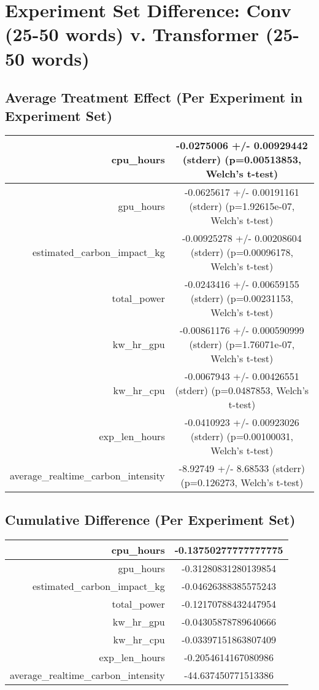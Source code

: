 \documentclass{article}%
\begin{document}
%
\normalsize%
\section{Experiment Set Difference: Conv (25{-}50 words) v. Transformer (25{-}50 words)}%
\label{sec:Experiment Set Difference Conv (25{-}50 words) v. Transformer (25{-}50 words)}%
\subsection{Average Treatment Effect (Per Experiment in Experiment Set)}%
\label{subsec:Average Treatment Effect (Per Experiment in Experiment Set)}%
\begin{tabular}{|r|c|}%
\hline%
cpu\_hours&{-}0.0275006 +/{-} 0.00929442 (stderr) (p=0.00513853, Welch's t{-}test)\\%
\hline%
gpu\_hours&{-}0.0625617 +/{-} 0.00191161 (stderr) (p=1.92615e{-}07, Welch's t{-}test)\\%
\hline%
estimated\_carbon\_impact\_kg&{-}0.00925278 +/{-} 0.00208604 (stderr) (p=0.00096178, Welch's t{-}test)\\%
\hline%
total\_power&{-}0.0243416 +/{-} 0.00659155 (stderr) (p=0.00231153, Welch's t{-}test)\\%
\hline%
kw\_hr\_gpu&{-}0.00861176 +/{-} 0.000590999 (stderr) (p=1.76071e{-}07, Welch's t{-}test)\\%
\hline%
kw\_hr\_cpu&{-}0.0067943 +/{-} 0.00426551 (stderr) (p=0.0487853, Welch's t{-}test)\\%
\hline%
exp\_len\_hours&{-}0.0410923 +/{-} 0.00923026 (stderr) (p=0.00100031, Welch's t{-}test)\\%
\hline%
average\_realtime\_carbon\_intensity&{-}8.92749 +/{-} 8.68533 (stderr) (p=0.126273, Welch's t{-}test)\\%
\hline%
\end{tabular}

%
\subsection{Cumulative Difference (Per Experiment Set)}%
\label{subsec:Cumulative Difference (Per Experiment Set)}%
\begin{tabular}{|r|c|}%
\hline%
cpu\_hours&{-}0.13750277777777775\\%
\hline%
gpu\_hours&{-}0.31280831280139854\\%
\hline%
estimated\_carbon\_impact\_kg&{-}0.04626388385575243\\%
\hline%
total\_power&{-}0.12170788432447954\\%
\hline%
kw\_hr\_gpu&{-}0.04305878789640666\\%
\hline%
kw\_hr\_cpu&{-}0.03397151863807409\\%
\hline%
exp\_len\_hours&{-}0.2054614167080986\\%
\hline%
average\_realtime\_carbon\_intensity&{-}44.637450771513386\\%
\hline%
\end{tabular}

%
\end{document}
